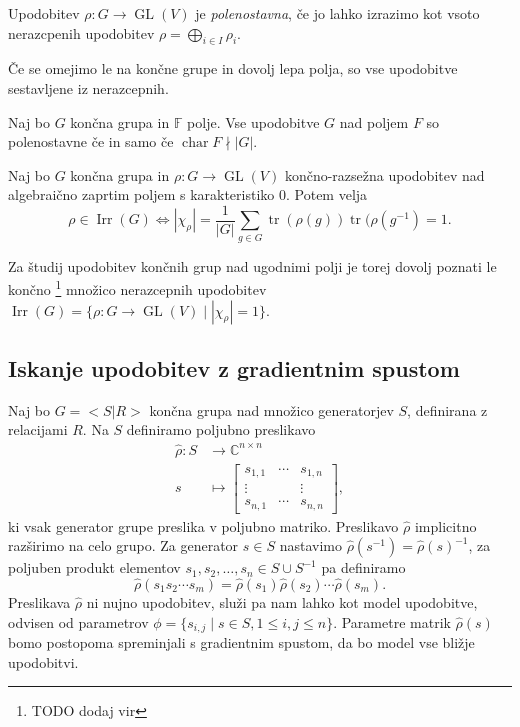\documentclass[mat2, tisk]{fmfdelo}
\newcommand{\C}{\mathbb C}
\begin{document}
    \begin{definicija}
        Upodobitev $\rho \colon G \to \operatorname{GL}(V)$ je \emph{polenostavna}, če jo lahko izrazimo kot vsoto nerazcpenih upodobitev $\rho = \bigoplus _{i \in I} \rho_i$. 
    \end{definicija}
    Če se omejimo le na končne grupe in dovolj lepa polja, so vse upodobitve sestavljene iz nerazcepnih.
    \begin{izrek}%
        Naj bo $G$ končna grupa in $\mathbb{F}$ 
        polje. Vse upodobitve $G$ nad poljem $F$ so polenostavne če in samo če $\operatorname{char}F \nmid |G|$.
    \end{izrek}
\begin{izrek}
    Naj bo $G$ končna grupa in $\rho \colon G \to \operatorname{GL}(V)$ končno-razsežna upodobitev nad algebraično zaprtim poljem s karakteristiko $0$. Potem velja 
    \begin{equation}
        \label{eq:nerazcepna iff norma=1}
        \rho \in \operatorname{Irr}(G) \iff |\chi_\rho| = \frac{1}{|G|} 
    \sum\limits_{g \in G} \operatorname{tr}(\rho(g)) \operatorname{tr}(\rho(g^{-1}) = 1.
    \end{equation}
\end{izrek}
    Za študij upodobitev končnih grup nad ugodnimi polji je torej dovolj poznati le končno \footnote{TODO dodaj vir} množico nerazcepnih upodobitev $\operatorname{Irr}(G) = \{ \rho \colon G \to \operatorname{GL}(V) \mid |\chi_\rho| = 1\}$.
    \subsection{Iskanje upodobitev z gradientnim spustom}
    Naj bo $G=<S|R>$ končna grupa nad množico generatorjev $S$, definirana z relacijami $R$. Na $S$ definiramo poljubno preslikavo
    \begin{align}
    \label{eq: repr model na S}
    \hat \rho \colon S &\to \C^{n \times n}    \\
    s &\mapsto 
        \begin{bmatrix}
        s_{1,1} & \cdots & s_{1,n} \\
        \vdots & & \vdots \\ 
        s_{n,1} & \cdots & s_{n,n}
    \end{bmatrix},
    \end{align}
    ki vsak generator grupe preslika v poljubno matriko. 
    Preslikavo $\hat \rho$ implicitno razširimo na celo grupo. Za generator $s \in S$ nastavimo $\hat \rho(s^{-1}) = \hat\rho(s)^{-1}$, za poljuben produkt elementov $s_1, s_2, \dotsc, s_n \in S \cup S^{-1}$
    pa definiramo
    \begin{equation}
        \label{eq: implicitna definicija upodovbitve}
        \hat \rho(s_1 s_2 \dotsm s_m) = \hat\rho(s_1)\hat\rho(s_2) \dotsm \hat\rho(s_m).
    \end{equation}
    Preslikava $\hat \rho$ ni nujno upodobitev, služi pa nam lahko kot model upodobitve, odvisen od parametrov $\phi = \{s_{i,j} \mid s \in S, 1 \leq i, j \leq n\}$.
    Parametre matrik $\hat\rho(s)$ bomo postopoma spreminjali s gradientnim spustom, da bo model vse bližje upodobitvi.
\end{document}
